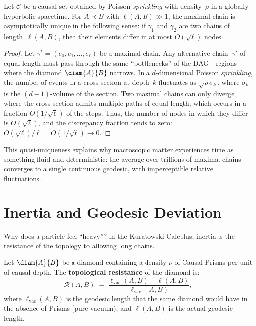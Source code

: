 \begin{theorem}
\label{thm:geodesic-uniqueness}
Let $\mathcal{C}$ be a causal set obtained by Poisson \emph{sprinkling}
with density~$\rho$ in a globally hyperbolic spacetime. For $A \prec B$
with $\ell(A,B) \gg 1$, the maximal chain is asymptotically unique in
the following sense: if $\gamma_1$ and $\gamma_2$ are two chains of
length~$\ell(A,B)$, then their elements differ in at most
$O(\sqrt{\ell})$ nodes.
\end{theorem}

\begin{proof}
Let $\gamma^* = (e_0, e_1, \ldots, e_\ell)$ be a maximal chain.
Any alternative chain~$\gamma'$ of equal length must pass through the
same ``bottlenecks'' of the DAG---regions where the diamond
$\diam{A}{B}$ narrows. In a $d$-dimensional Poisson
\emph{sprinkling}, the number of events in a cross-section at
depth~$k$ fluctuates as $\sqrt{\rho\,\sigma_k}$, where $\sigma_k$ is
the $(d{-}1)$-volume of the section. Two maximal chains can only
diverge where the cross-section admits multiple paths of equal length,
which occurs in a fraction $O(1/\sqrt{\ell})$ of the steps. Thus, the
number of nodes in which they differ is $O(\sqrt{\ell})$, and the
discrepancy fraction tends to zero: $O(\sqrt{\ell})/\ell =
O(1/\sqrt{\ell}) \to 0$.
\end{proof}

\noindent
This quasi-uniqueness explains why macroscopic matter experiences time
as something fluid and deterministic: the average over trillions of
maximal chains converges to a single continuous geodesic, with
imperceptible relative fluctuations.

\section{Inertia and Geodesic Deviation}

Why does a particle feel ``heavy''? In the Kuratowski Calculus,
inertia is the resistance of the topology to allowing long chains.

\begin{definition}
\label{def:topological-resistance}
Let $\diam{A}{B}$ be a diamond containing a density $\nu$ of Causal
Prisms per unit of causal depth. The \textbf{topological resistance}
of the diamond is:
\begin{equation}
  \mathcal{R}(A,B)
  \;=\;
  \frac{\ell_{\text{vac}}(A,B) - \ell(A,B)}{\ell_{\text{vac}}(A,B)},
  \label{eq:topological-resistance}
\end{equation}
where $\ell_{\text{vac}}(A,B)$ is the geodesic length that the same
diamond would have in the absence of Prisms (pure vacuum), and
$\ell(A,B)$ is the actual geodesic length.
\end{definition}

